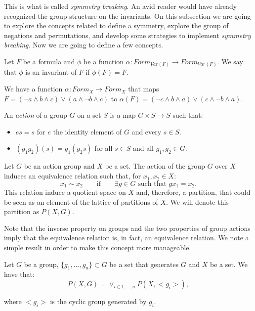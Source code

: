 


This is what is called \emph{symmetry breaking}. An avid reader would have already recognized the group structure on the invariants.  On this subsection we are going to explore the concepts related to define a symmetry, explore the group of negations and permutations, and develop some strategies to implement \emph{symmetry breaking}.  Now we are going to define a few concepts.


\begin{definition}
Let $F$ be a formula and $\phi$ be a function $\alpha:Form_{Var(F)}\to Form_{Var(F)}$. We say that $\phi$ is an invariant of $F$ if $\phi(F) = F$.
\end{definition}

 We have a function $\alpha :Form_{X}\to Form_{X}$ that maps $F = (\neg a \land b  \land c) \lor (a \land \neg b \land c)$ to $\alpha(F) = (\neg c \land b  \land a) \lor (c \land \neg b \land a)$.\\



 \begin{definition}
  An \emph{action} of a group $G$ on a set $S$ is a map $G \times S \to S$ such that:
  \begin{itemize}
  \item $es = s$ for $e$ the identity element of $G$ and every $s\in S$.
  \item $(g_1g_2)(s) = g_1(g_2s)$ for all $s \in S$ and all $g_1,g_2\in G$.
    \end{itemize}
\end{definition}


\begin{definition}
  Let $G$ be an action group and $X$ be a set. The action of the group $G$ over $X$ induces an equivalence relation such that, for $x_1,x_2 \in X$:
  $$x_1 \sim x_2 \qquad \text{if} \qquad  \exists g\in G\text{ such that } gx_1=x_2 .$$
  This relation induce a quotient space on $X$ and, therefore, a partition, that could be seen as an element of the lattice of partitions of $X$. We will denote this partition as $P(X,G).$
\end{definition}

Note that the inverse property on groups and the two properties of group actions imply that the equivalence relation is, in fact, an equivalence relation. We note a simple result in order to make this concept more manageable.

\begin{proposition}
  Let $G$ be a group, $\{g_1,...,g_n\}\subset G$ be a set that generates $G$ and $X$ be a set. We have that:
  $$P(X,G) = \lor_{i\in 1,...,n} P(X,<g_i>) ,$$

  where $<g_i>$ is the cyclic group generated by $g_i$.
\end{proposition}

